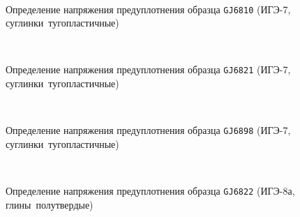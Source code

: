    \begin{figure}
        {\centering
        \small
            \hfill 
            \\
            \hfill  
            \hfill 
            }
            \caption{Определение напряжения предуплотнения образца \texttt{GJ6810} (ИГЭ-7, суглинки тугопластичные)}
            \label{img:6810}
    \end{figure}
    
    \begin{figure}
        {\centering
        \small
            \hfill 
            \\
            \hfill  
            \hfill 
            }
            \caption{Определение напряжения предуплотнения образца \texttt{GJ6821} (ИГЭ-7, суглинки тугопластичные)}
            \label{img:6821}
    \end{figure}
    
    \begin{figure}
        {\centering
        \small
            \hfill 
            \\
            \hfill  
            \hfill 
            }
            \caption{Определение напряжения предуплотнения образца \texttt{GJ6898} (ИГЭ-7, суглинки тугопластичные)}
            \label{img:6898}
    \end{figure}
    
    \begin{figure}
        {\centering
        \small
            \hfill 
            \\
            \hfill  
            \hfill 
            }
            \caption{Определение напряжения предуплотнения образца \texttt{GJ6822} (ИГЭ-8а, глины полутвердые)}
            \label{img:6822}
    \end{figure}
    
